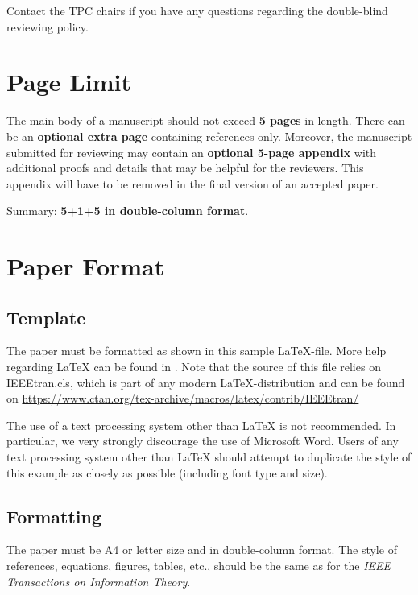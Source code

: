 \documentclass[conference,a4paper]{IEEEtran}
\begin{document}
Contact the TPC chairs if you have any questions regarding the
double-blind reviewing policy. 



\section{Page Limit}
\label{sec:page-limit}

The main body of a manuscript should not exceed \textbf{5 pages} in
length. There can be an \textbf{optional extra page} containing
references only. Moreover, the manuscript submitted for reviewing may
contain an \textbf{optional 5-page appendix} with additional proofs
and details that may be helpful for the reviewers. This appendix will
have to be removed in the final version of an accepted paper.

Summary: \textbf{5+1+5 in double-column format}.


\section{Paper Format}
\label{sec:paper-format}

\subsection{Template}
\label{sec:template}

The paper must be formatted as shown in this sample
\LaTeX{}-file. More help regarding \LaTeX{} can be found in
\cite{Laport:LaTeX, GMS:LaTeXComp, oetiker_latex, typesetmoser,
  shell15}. Note that the source of this file relies on IEEEtran.cls,
which is part of any modern \LaTeX{}-distribution and can be found on
\url{https://www.ctan.org/tex-archive/macros/latex/contrib/IEEEtran/}

The use of a text processing system other than \LaTeX{} is not
recommended. In particular, we very strongly discourage the use of
Microsoft Word.  Users of any text processing system other than
\LaTeX{} should attempt to duplicate the style of this example as
closely as possible (including font type and size).


\subsection{Formatting}
\label{sec:formatting}

The paper must be A4 or letter size and in double-column format.  The
style of references, equations, figures, tables, etc., should be the
same as for the \emph{IEEE Transactions on Information Theory}.
\end{document}
